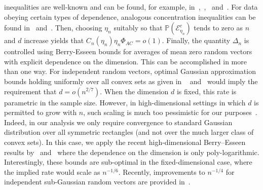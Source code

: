 \documentclass{article}
\begin{document}
inequalities are well-known and can be found, for example, in~\cite{LED91},~\cite{einmahl2008characterization},~\cite{Ver12,Vershynin18} and~\cite{tropp2016expected}. For data obeying certain types of dependence, analogous concentration inequalities can be found in~\cite{Liu13} and~\citet{Uniform:Kuch18}. Then, choosing $\eta_n$ suitably so that $\mathbb{P}(\mathcal{E}_{\eta_n}^c)$ tends to zero as $n$ and $d$ increase yields that $C_n(\eta_n)\eta_n\Phi_{AC} = o(1)$. Finally, the quantity $\Delta_n$ is controlled using Berry-Esseen bounds for averages of mean zero random vectors with explicit dependence on the dimension. This can be accomplished in more than one way. For independent random vectors, optimal Gaussian approximation bounds holding uniformly over all convex sets as given in ~\cite{bentkus2003dependence} and~\cite{raivc2019multivariate} would imply the requirement that $d = o(n^{2/7})$. When the dimension $d$ is fixed, this rate is parametric in the sample size. However, in high-dimensional settings in which $d$ is permitted to grow with $n$, such scaling is much too pessimistic for our purposes~\citep{MR1115160}. Indeed, in our analysis we only require convergence to standard Gaussian distribution over all symmetric rectangles (and not over the much larger class of convex sets). In this case, we apply the recent high-dimensional Berry--Esseen results by~\cite{Chern17} and~\cite{koike2019notes} \citep{ZhangWu17} where the dependence on the dimension is only poly-logarithmic. Interestingly, these bounds are sub-optimal in the fixed-dimensional case, where the implied rate would scale as $n^{-1/6}$. Recently, improvements to $n^{-1/4}$ for independent sub-Gaussian random vectors are provided in~\cite{chernozhukov2019improved}.
\end{document}
